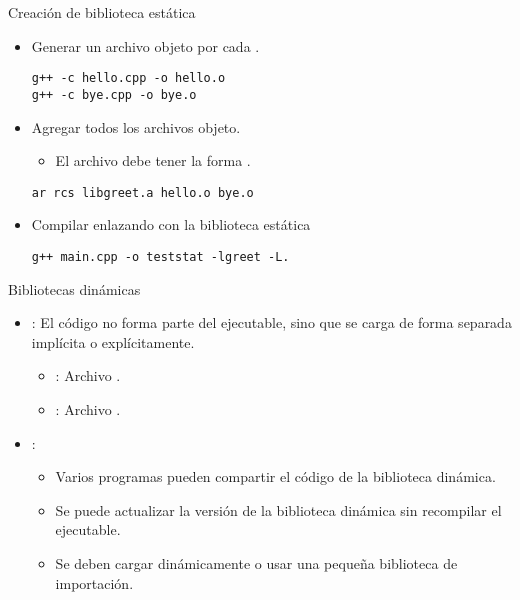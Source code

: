 \begin{frame}[t,fragile]{Creación de biblioteca estática}
\begin{itemize}
  \item Generar un archivo objeto por cada .
\begin{lstlisting}[style=terminal]
g++ -c hello.cpp -o hello.o
g++ -c bye.cpp -o bye.o
\end{lstlisting}
  \item Agregar todos los archivos objeto.
    \begin{itemize}
      \item El archivo debe tener la forma .
    \end{itemize}
\begin{lstlisting}[style=terminal]
ar rcs libgreet.a hello.o bye.o
\end{lstlisting}
  \item Compilar enlazando con la biblioteca estática
\begin{lstlisting}[style=terminal]
g++ main.cpp -o teststat -lgreet -L.
\end{lstlisting}
\end{itemize}
\end{frame}

\begin{frame}[t]{Bibliotecas dinámicas}
\begin{itemize}
  \item {}: El código no forma parte del ejecutable,
        sino que se carga de forma separada implícita o explícitamente.
    \begin{itemize}
      \item {}: Archivo .
      \item {}: Archivo .
    \end{itemize}

  \vfill
  \item {}:
    \begin{itemize}
      \item Varios programas pueden compartir el código de la biblioteca dinámica.
      \item Se puede actualizar la versión de la biblioteca dinámica sin recompilar el ejecutable.
      \item Se deben cargar dinámicamente o usar una pequeña biblioteca de importación.
    \end{itemize}
\end{itemize}
\end{frame}


